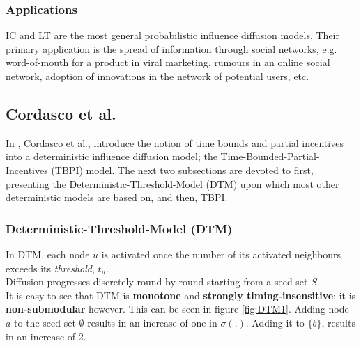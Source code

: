 \documentclass[twocolumn, 10pt]{article}
\begin{document}
\subsubsection{Applications}
IC and LT are the most general probabilistic influence diffusion models. Their primary application is the spread of information through social networks, e.g. word-of-mouth for a product in viral marketing, rumours in an online social network, adoption of innovations in the network of potential users, etc.
\subsection{Cordasco et al. \cite{cordasco}}
In \cite{cordasco}, Cordasco et al., introduce the notion of time bounds and partial incentives into a deterministic influence diffusion model; the Time-Bounded-Partial-Incentives (TBPI) model. The next two subsections are devoted to first, presenting the Deterministic-Threshold-Model (DTM) upon which most other deterministic models are based on, and then, TBPI.
\subsubsection{Deterministic-Threshold-Model (DTM)}
In DTM, each node $u$ is activated once the number of its activated neighbours exceeds its \textit{threshold}, $t_u$. \\
Diffusion progresses discretely round-by-round starting from a seed set $S$. \\
It is easy to see that DTM is \textbf{monotone} and \textbf{strongly timing-insensitive}; it is \textbf{non-submodular} however. This can be seen in figure \ref{fig:DTM1}. Adding node $a$ to the seed set $\emptyset$ results in an increase of one in $\sigma(.)$. Adding it to $\{b\}$, results in an increase of 2.
\end{document}
